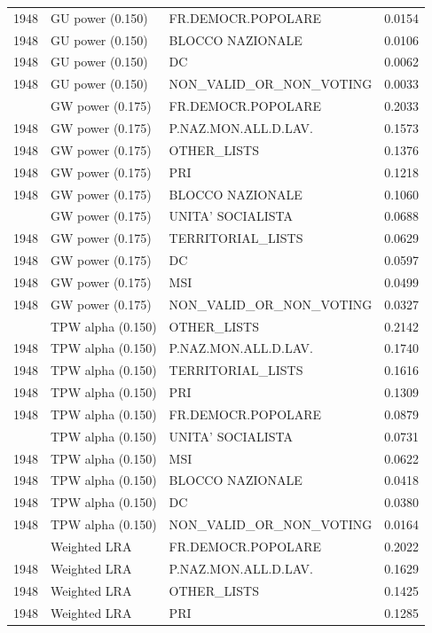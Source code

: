 \begin{longtable}[t]{rllr}
1948 & GU power (0.150) & FR.DEMOCR.POPOLARE & 0.0154\\
1948 & GU power (0.150) & BLOCCO NAZIONALE & 0.0106\\
1948 & GU power (0.150) & DC & 0.0062\\
1948 & GU power (0.150) & NON\_VALID\_OR\_NON\_VOTING & 0.0033\\
\addlinespace
1948 & GW power (0.175) & FR.DEMOCR.POPOLARE & 0.2033\\
1948 & GW power (0.175) & P.NAZ.MON.ALL.D.LAV. & 0.1573\\
1948 & GW power (0.175) & OTHER\_LISTS & 0.1376\\
1948 & GW power (0.175) & PRI & 0.1218\\
1948 & GW power (0.175) & BLOCCO NAZIONALE & 0.1060\\
\addlinespace
1948 & GW power (0.175) & UNITA' SOCIALISTA & 0.0688\\
1948 & GW power (0.175) & TERRITORIAL\_LISTS & 0.0629\\
1948 & GW power (0.175) & DC & 0.0597\\
1948 & GW power (0.175) & MSI & 0.0499\\
1948 & GW power (0.175) & NON\_VALID\_OR\_NON\_VOTING & 0.0327\\
\addlinespace
1948 & TPW alpha (0.150) & OTHER\_LISTS & 0.2142\\
1948 & TPW alpha (0.150) & P.NAZ.MON.ALL.D.LAV. & 0.1740\\
1948 & TPW alpha (0.150) & TERRITORIAL\_LISTS & 0.1616\\
1948 & TPW alpha (0.150) & PRI & 0.1309\\
1948 & TPW alpha (0.150) & FR.DEMOCR.POPOLARE & 0.0879\\
\addlinespace
1948 & TPW alpha (0.150) & UNITA' SOCIALISTA & 0.0731\\
1948 & TPW alpha (0.150) & MSI & 0.0622\\
1948 & TPW alpha (0.150) & BLOCCO NAZIONALE & 0.0418\\
1948 & TPW alpha (0.150) & DC & 0.0380\\
1948 & TPW alpha (0.150) & NON\_VALID\_OR\_NON\_VOTING & 0.0164\\
\addlinespace
1948 & Weighted LRA & FR.DEMOCR.POPOLARE & 0.2022\\
1948 & Weighted LRA & P.NAZ.MON.ALL.D.LAV. & 0.1629\\
1948 & Weighted LRA & OTHER\_LISTS & 0.1425\\
1948 & Weighted LRA & PRI & 0.1285\\

\end{longtable}
